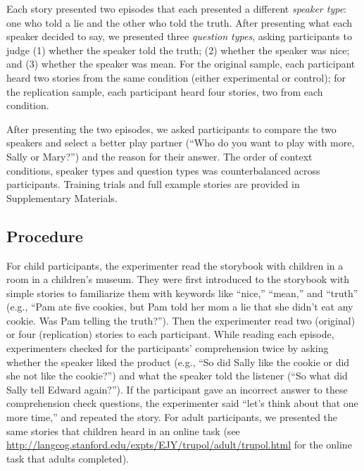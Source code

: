 \documentclass[oneside]{report}
\begin{document}
Each story presented two episodes that each presented a different
\emph{speaker type}: one who told a lie and the other who told the
truth. After presenting what each speaker decided to say, we presented
three \emph{question types}, asking participants to judge (1) whether
the speaker told the truth; (2) whether the speaker was nice; and (3)
whether the speaker was mean. For the original sample, each participant
heard two stories from the same condition (either experimental or
control); for the replication sample, each participant heard four
stories, two from each condition.

After presenting the two episodes, we asked participants to compare the
two speakers and select a better play partner (``Who do you want to play
with more, Sally or Mary?'') and the reason for their answer. The order
of context conditions, speaker types and question types was
counterbalanced across participants. Training trials and full example
stories are provided in Supplementary Materials.

\subsection{Procedure}\label{procedure-3}

For child participants, the experimenter read the storybook with
children in a room in a children's museum. They were first introduced to
the storybook with simple stories to familiarize them with keywords like
``nice,'' ``mean,'' and ``truth'' (e.g., ``Pam ate five cookies, but Pam
told her mom a lie that she didn't eat any cookie. Was Pam telling the
truth?''). Then the experimenter read two (original) or four
(replication) stories to each participant. While reading each episode,
experimenters checked for the participants' comprehension twice by
asking whether the speaker liked the product (e.g., ``So did Sally like
the cookie or did she not like the cookie?'') and what the speaker told
the listener (``So what did Sally tell Edward again?''). If the
participant gave an incorrect answer to these comprehension check
questions, the experimenter said ``let's think about that one more
time,'' and repeated the story. For adult participants, we presented the
same stories that children heard in an online task (see
\url{http://langcog.stanford.edu/expts/EJY/trupol/adult/trupol.html} for
the online task that adults completed).
\end{document}
